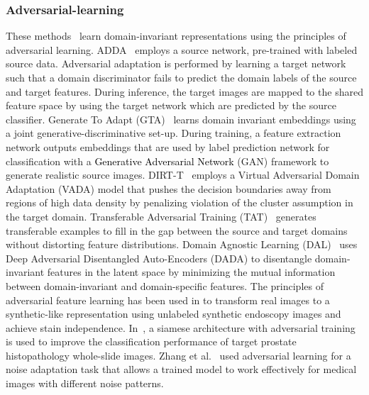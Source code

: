 \documentclass[journal,twoside,web]{IEEEtran}
\newcommand{\cc}{\textcolor{black}}
\begin{document}
\subsubsection{Adversarial-learning} These methods~\cite{tzeng2017adversarial, ganin2017domain, sankaranarayanan2018generate} learn domain-invariant representations using the principles of adversarial learning. 
ADDA~\cite{tzeng2017adversarial} employs a source network, pre-trained with labeled source data. Adversarial adaptation is performed by learning a target network such that a domain discriminator fails to predict the domain labels of the source and target features. During inference, the target images are mapped to the shared feature space by using the target network which are predicted by the source classifier. Generate To Adapt (GTA)~\cite{sankaranarayanan2018generate} learns domain invariant embeddings using a joint generative-discriminative set-up. During training, a feature extraction network outputs embeddings that are used by label prediction network for classification with a \cc{Generative Adversarial Network} (GAN) framework to generate realistic source images. DIRT-T~\cite{shu2018dirt} employs a Virtual Adversarial Domain Adaptation (VADA) model that pushes the decision boundaries away from regions of high data density by penalizing violation of the cluster assumption in the target domain. Transferable Adversarial Training (TAT)~\cite{liu2019transferable} generates transferable examples to fill in the gap between the source and target domains without distorting feature distributions. Domain Agnostic Learning (DAL)~\cite{peng2019domain} uses Deep Adversarial Disentangled Auto-Encoders (DADA) to disentangle domain-invariant features in the latent space by minimizing  the mutual information between domain-invariant and domain-specific features. The principles of adversarial feature learning has been used in \cite{mahmood2018unsupervised,gadermayr2019generative} to transform real images to a synthetic-like representation using unlabeled  synthetic endoscopy images and achieve stain independence. In~\cite{bertinetto2016fully}, a siamese architecture with adversarial training is used to improve the classification performance of target prostate histopathology whole-slide images. Zhang et al.~\cite{zhang2019noise} used adversarial learning for a noise adaptation task that allows a trained model to work effectively for medical images with different noise patterns.
\end{document}
